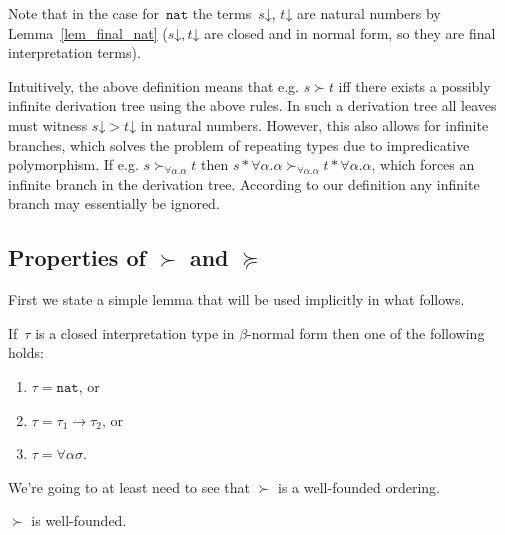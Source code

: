 \documentclass[runningheads,a4paper]{llncs}
\newcommand{\arrtype}{\rightarrow}
\newcommand{\tapp}[2]{#1 * #2}
\newcommand{\nat}{\mathtt{nat}}
\newcommand{\da}{\mathord{\downarrow}}
\begin{document}
Note that in the case for~$\nat$ the terms~$s\da$, $t\da$ are natural
numbers by Lemma~\ref{lem_final_nat} ($s\da,t\da$ are closed and in
normal form, so they are final interpretation terms).

Intuitively, the above definition means that e.g. $s \succ t$ iff
there exists a possibly infinite derivation tree using the above
rules. In such a derivation tree all leaves must witness $s\da > t\da$
in natural numbers. However, this also allows for infinite branches,
which solves the problem of repeating types due to impredicative
polymorphism. If e.g.  $s \succ_{\forall \alpha . \alpha} t$ then
$\tapp{s}{\forall\alpha.\alpha} \succ_{\forall \alpha . \alpha}
\tapp{t}{\forall\alpha.\alpha}$, which forces an infinite branch in
the derivation tree. According to our definition any infinite branch
may essentially be ignored.

\subsection{Properties of $\succ$ and $\succeq$}

First we state a simple lemma that will be used implicitly in what
follows.

\begin{lemma}
  If~$\tau$ is a closed interpretation type in $\beta$-normal form then
  one of the following holds:
  \begin{enumerate}
  \item $\tau = \nat$, or
  \item $\tau = \tau_1\arrtype\tau_2$, or
  \item $\tau = \forall\alpha\sigma$.
  \end{enumerate}
\end{lemma}

We're going to at least need to see that $\succ$ is a well-founded
ordering.

\begin{lemma}
  $\succ$ is well-founded.
\end{lemma}
\end{document}
